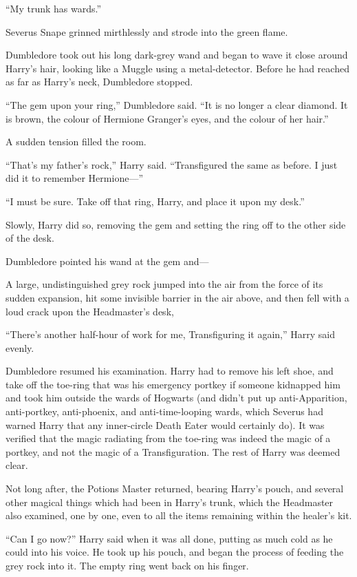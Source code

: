 “My trunk has wards.”

Severus Snape grinned mirthlessly and strode into the green flame.

Dumbledore took out his long dark-grey wand and began to wave it close around Harry’s hair, looking like a Muggle using a metal-detector. Before he had reached as far as Harry’s neck, Dumbledore stopped.

“The gem upon your ring,” Dumbledore said. “It is no longer a clear diamond. It is brown, the colour of Hermione Granger’s eyes, and the colour of her hair.”

A sudden tension filled the room.

“That’s my father’s rock,” Harry said. “Transfigured the same as before. I just did it to remember Hermione—”

“I must be sure. Take off that ring, Harry, and place it upon my desk.”

Slowly, Harry did so, removing the gem and setting the ring off to the other side of the desk.

Dumbledore pointed his wand at the gem and—

A large, undistinguished grey rock jumped into the air from the force of its sudden expansion, hit some invisible barrier in the air above, and then fell with a loud crack upon the Headmaster’s desk,

“There’s another half-hour of work for me, Transfiguring it again,” Harry said evenly.

Dumbledore resumed his examination. Harry had to remove his left shoe, and take off the toe-ring that was his emergency portkey if someone kidnapped him and took him outside the wards of Hogwarts (and didn’t put up anti-Apparition, anti-portkey, anti-phoenix, and anti-time-looping wards, which Severus had warned Harry that any inner-circle Death Eater would certainly do). It was verified that the magic radiating from the toe-ring was indeed the magic of a portkey, and not the magic of a Transfiguration. The rest of Harry was deemed clear.

Not long after, the Potions Master returned, bearing Harry’s pouch, and several other magical things which had been in Harry’s trunk, which the Headmaster also examined, one by one, even to all the items remaining within the healer’s kit.

“Can I go now?” Harry said when it was all done, putting as much cold as he could into his voice. He took up his pouch, and began the process of feeding the grey rock into it. The empty ring went back on his finger.

